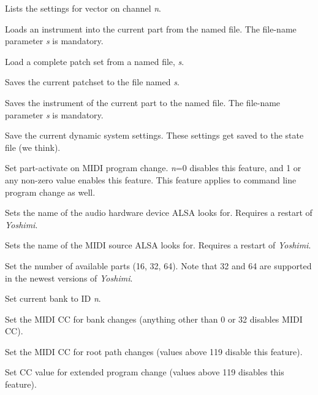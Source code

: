       Lists the settings for vector on channel \textsl{n}.

      Loads an instrument into the current part from the named file.
      The file-name parameter \textsl{s} is mandatory.

      Load a complete patch set from a named file, \textsl{s}.

      Saves the current patchset to the file named \textsl{s}.

      Saves the instrument of the current part to the named file.
      The file-name parameter \textsl{s} is mandatory.

      Save the current dynamic system settings.
      These settings get saved to the state file (we think).

      Set part-activate on MIDI program change.
      \textsl{n}=0 disables this feature, and
      1 or any non-zero value enables this feature.
      This feature applies to command line program change as well.

      Sets the name of the audio hardware device ALSA looks for.
      Requires a restart of \textsl{Yoshimi}.

      Sets the name of the MIDI source ALSA looks for.
      Requires a restart of \textsl{Yoshimi}.

      Set the number of available parts (16, 32, 64).
      Note that 32 and 64 are supported in the newest versions of
      \textsl{Yoshimi}.

      Set current bank to ID \textsl{n}.

      Set the MIDI CC for bank changes (anything other than 0 or 32
      disables MIDI CC).

      Set the MIDI CC for root path changes (values above 119 disable this
      feature).

      Set CC value for extended program change (values above 119 disables this
      feature).

